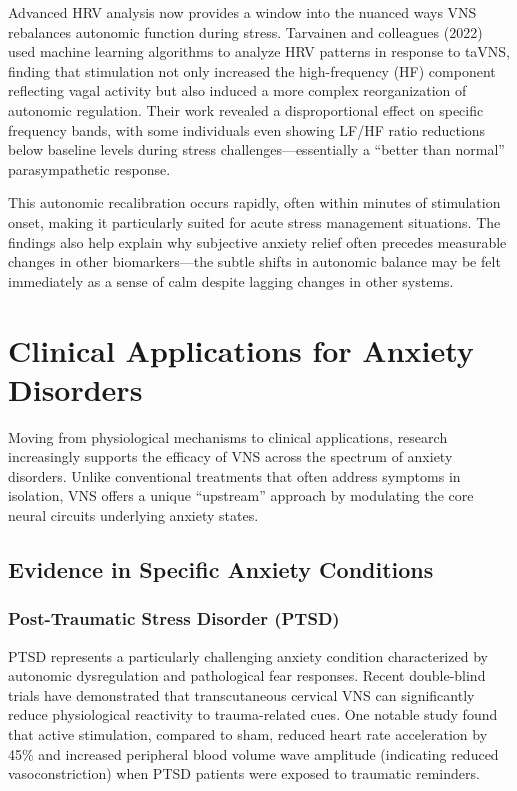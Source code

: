 \documentclass[
  Letterpaper,
]{scrbook}
\begin{document}
Advanced HRV analysis now provides a window into the nuanced ways VNS
rebalances autonomic function during stress. Tarvainen and colleagues
(2022) used machine learning algorithms to analyze HRV patterns in
response to taVNS, finding that stimulation not only increased the
high-frequency (HF) component reflecting vagal activity but also induced
a more complex reorganization of autonomic regulation. Their work
revealed a disproportional effect on specific frequency bands, with some
individuals even showing LF/HF ratio reductions below baseline levels
during stress challenges---essentially a ``better than normal''
parasympathetic response.

This autonomic recalibration occurs rapidly, often within minutes of
stimulation onset, making it particularly suited for acute stress
management situations. The findings also help explain why subjective
anxiety relief often precedes measurable changes in other
biomarkers---the subtle shifts in autonomic balance may be felt
immediately as a sense of calm despite lagging changes in other systems.

\section{Clinical Applications for Anxiety
Disorders}\label{clinical-applications-for-anxiety-disorders}

Moving from physiological mechanisms to clinical applications, research
increasingly supports the efficacy of VNS across the spectrum of anxiety
disorders. Unlike conventional treatments that often address symptoms in
isolation, VNS offers a unique ``upstream'' approach by modulating the
core neural circuits underlying anxiety states.

\subsection{Evidence in Specific Anxiety
Conditions}\label{evidence-in-specific-anxiety-conditions}

\subsubsection{Post-Traumatic Stress Disorder
(PTSD)}\label{post-traumatic-stress-disorder-ptsd}

PTSD represents a particularly challenging anxiety condition
characterized by autonomic dysregulation and pathological fear
responses. Recent double-blind trials have demonstrated that
transcutaneous cervical VNS can significantly reduce physiological
reactivity to trauma-related cues. One notable study found that active
stimulation, compared to sham, reduced heart rate acceleration by 45\%
and increased peripheral blood volume wave amplitude (indicating reduced
vasoconstriction) when PTSD patients were exposed to traumatic
reminders.
\end{document}
